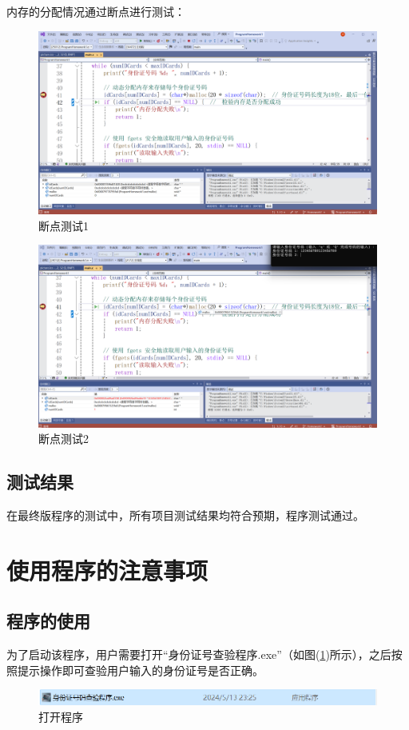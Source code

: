 \documentclass[withoutpreface,bwprint]{cumcmthesis}  %
\begin{document}
		
		内存的分配情况通过断点进行测试：
		\begin{figure}[ht]
			\centering
			\includegraphics[width=.8\textwidth]{断点1.png}
			\caption{断点测试1}
		\end{figure}
		\begin{figure}[ht]
			\centering
			\includegraphics[width=.8\textwidth]{断点2.png}
			\caption{断点测试2}
		\end{figure}
		
		\newpage
		\subsection{测试结果}
		在最终版程序的测试中，所有项目测试结果均符合预期，程序测试通过。
		
		\newpage
		\section{使用程序的注意事项}
		\subsection{程序的使用}
		为了启动该程序，用户需要打开“身份证号查验程序.exe”（如图(\ref{start})所示），之后按照提示操作即可查验用户输入的身份证号是否正确。
		
		\begin{figure}[ht]
			\centering
			\includegraphics[width=.8\textwidth]{打开程序.png}
			\caption{打开程序}
			\label{start}
		\end{figure}
		
\end{document}
